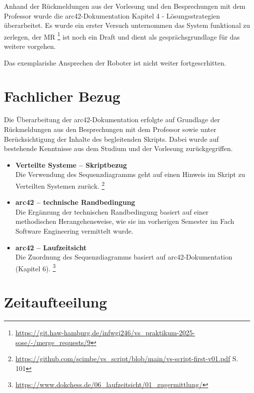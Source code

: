 \documentclass{article}
\begin{document}
Anhand der Rückmeldungen aus der Vorlesung und den Besprechungen mit dem Professor wurde die arc42-Dokumentation Kapitel 4 - Lösungsstrategien überarbeitet.
Es wurde ein erster Versuch unternommen das System funktional zu zerlegen, der MR
\footnote{\url{https://git.haw-hamburg.de/infwgi246/vs_praktikum-2025-sose/-/merge_requests/9}}
ist noch ein Draft und dient als gesprächsgrundlage für das weitere vorgehen. 

Das exemplarishe Ansprechen der Roboter ist nicht weiter fortgescrhitten.




\section{Fachlicher Bezug}

Die Überarbeitung der arc42-Dokumentation erfolgte auf Grundlage der Rückmeldungen aus den Besprechungen mit dem Professor sowie unter Berücksichtigung der Inhalte des begleitenden Skripts.  
Dabei wurde auf bestehende Kenntnisse aus dem Studium und der Vorlesung zurückgegriffen.

\begin{itemize}

\item \textbf{Verteilte Systeme – Skriptbezug} \\
Die Verwendung des Sequenzdiagramms geht auf einen Hinweis im Skript zu Verteilten Systemen zurück.
\footnote{\url{https://github.com/scimbe/vs_script/blob/main/vs-script-first-v01.pdf} S. 101 }
\item \textbf{arc42 – technische Randbedingung} \\
Die Ergänzung der technischen Randbedingung basiert auf einer methodischen Herangehensweise, wie sie im vorherigen Semester im Fach Software Engineering vermittelt wurde.
\item \textbf{arc42 – Laufzeitsicht} \\
Die Zuordnung des Sequenzdiagramms basiert auf arc42-Dokumentation (Kapitel 6). 
\footnote {\url{https://www.dokchess.de/06_laufzeitsicht/01_zugermittlung/}}


\end{itemize}

\clearpage
\section{Zeitaufteeilung}
\end{document}
